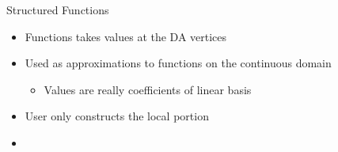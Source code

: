 \begin{frame}{Structured Functions}

\begin{itemize}
  \item Functions takes values at the DA vertices

  \item Used as approximations to functions on the continuous domain
  \begin{itemize}
    \item Values are really coefficients of linear basis
  \end{itemize}

  \item User only constructs the local portion

  \item {}
\end{itemize}
\end{frame}
